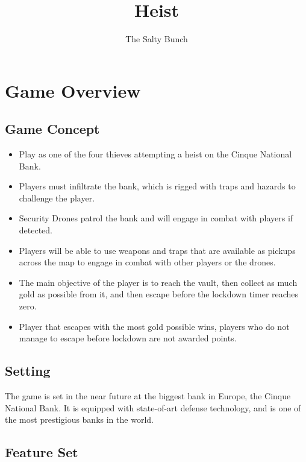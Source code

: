 \documentclass[14pt]{report}
\title{Heist}
\author{The Salty Bunch}
\begin{document}
\maketitle



\tableofcontents


\chapter{Game Overview}

\section{Game Concept}

\begin{itemize}
    \item Play as one of the four thieves attempting a heist on the Cinque National Bank.
    \item Players must infiltrate the bank, which is rigged with traps and hazards to challenge the player.
    \item Security Drones patrol the bank and will engage in combat with players if detected.
    \item Players will be able to use weapons and traps that are available as pickups across the map to engage in combat with other players or the drones.
    \item The main objective of the player is to reach the vault, then collect as much gold as possible from it, and then escape before the lockdown timer reaches zero.
    \item Player that escapes with the most gold possible wins, players who do not manage to escape before lockdown are not awarded points.
\end{itemize}

\section{Setting}

The game is set in the near future at the biggest bank in Europe, the Cinque National Bank. It is equipped with state-of-art defense technology, and is one of the most prestigious banks in the world.

\section{Feature Set}
\end{document}
